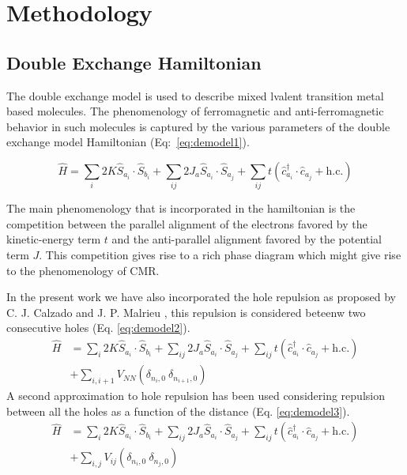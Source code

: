 \documentclass[12pt,twoside]{report}
\begin{document}
	\chapter{Methodology}
	\section{Double Exchange Hamiltonian}
	The double exchange model is used to describe mixed lvalent transition
	metal based molecules. The phenomenology of ferromagnetic and anti-ferromagnetic
	behavior in such molecules is captured by the various parameters of the
	double exchange model Hamiltonian (Eq:~\ref{eq:demodel1}).
	
	\begin{equation}
			\hat{H}  = \sum_i 2K \hat{S}_{a_i}\cdot\hat{S}_{b_i} 
			+ \sum_{ij} 2J_a \hat{S}_{a_i}\cdot\hat{S}_{a_j} 
			+ \sum_{ij} t\left( \hat{c}^{\dagger}_{a_i}\cdot\hat{c}_{a_j} + \text{h.c.}\right )
		\label{eq:demodel1}
	\end{equation}
	
	The main phenomenology that is incorporated in the hamiltonian is the
	competition between the parallel alignment of the electrons favored by the
	kinetic-energy term $t$ and the anti-parallel alignment favored by the
	potential term $J$. This competition gives rise to a rich phase diagram
	which might give rise to the phenomenology of CMR.

	In the present work we have also incorporated the hole repulsion as proposed
	by C. J. Calzado and J.  P. Malrieu \cite{calzado_proposal_2001}, this
	repulsion is considered beteenw two consecutive holes (Eq.
	\ref{eq:demodel2}).
	\begin{equation}
		\begin{split}
			\hat{H} & = \sum_i 2K \hat{S}_{a_i}\cdot\hat{S}_{b_i} 
			+ \sum_{ij} 2J_a \hat{S}_{a_i}\cdot\hat{S}_{a_j} 
			+ \sum_{ij} t\left( \hat{c}^{\dagger}_{a_i}\cdot\hat{c}_{a_j} + \text{h.c.}\right ) \\
		&	+ \sum_{i,i+1} V_{NN}\left ( \delta_{n_i,0}\ \delta_{n_{i+1},0} \right ) 
		\end{split}
		\label{eq:demodel2}
	\end{equation}
	A second approximation to hole repulsion has been used considering repulsion
	between all the holes as a function of the distance (Eq. \ref{eq:demodel3}).
	\begin{equation}
		\begin{split}
			\hat{H} & = \sum_i 2K \hat{S}_{a_i}\cdot\hat{S}_{b_i} 
			+ \sum_{ij} 2J_a \hat{S}_{a_i}\cdot\hat{S}_{a_j} 
			+ \sum_{ij} t\left( \hat{c}^{\dagger}_{a_i}\cdot\hat{c}_{a_j} + \text{h.c.}\right ) \\
		&	+ \sum_{i,j} V_{ij}\left ( \delta_{n_i,0}\ \delta_{n_{j},0} \right )
		\end{split}
		\label{eq:demodel3}
	\end{equation}
	
\end{document}

